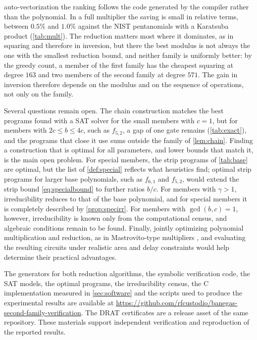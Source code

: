 \documentclass{ieeeaccess}
\theoremstyle{plain}
\theoremstyle{definition}
\begin{document}
auto-vectorization the ranking follows the code generated by the compiler
rather than the polynomial. In a full multiplier the saving is small in relative terms,
between $0.5\%$ and $1.0\%$ against the NIST pentanomials with a Karatsuba
product (\cref{tab:mult}). The reduction matters most where it dominates, as in
squaring and therefore in inversion, but there the best modulus is not always
the one with the smallest reduction bound, and neither family is uniformly
better: by the greedy count, a member of the first family has the cheapest
squaring at degree $163$ and two members of the second family at degree $571$.
The gain in inversion therefore depends on the modulus and on the sequence of
operations, not only on the family.

Several questions remain open. The chain construction matches the best programs
found with a SAT solver for the small members with $c=1$, but for members
with $2c\le b\le4c$, such as $f_{5,2}$, a gap of one gate remains
(\cref{tab:exact}), and the programs that close it use sums outside the family
of \cref{lem:chain}. Finding a construction that is optimal for all parameters,
and lower bounds that match it, is the main open problem. For special members,
the strip programs of \cref{tab:base} are optimal, but the list of
\cref{def:special} reflects what heuristics find; optimal strip programs for
larger base polynomials, such as $f_{6,1}$ and $f_{5,2}$, would extend the
strip bound \eqref{eq:specialbound} to further ratios $b/c$. For members with
$\gamma>1$, irreducibility reduces to that of the base polynomial, and for
special members it is completely described by \cref{prop:specirr}. For members
with $\gcd(b,c)=1$, however, irreducibility is known only from the
computational census, and algebraic conditions remain to be found. Finally,
jointly optimizing polynomial multiplication and reduction, as in
Mastrovito-type multipliers \cite{Mastrovito1989,ReyhaniHasan2004}, and
evaluating the resulting circuits under realistic area and delay constraints
would help determine their practical advantages.

The generators for both reduction algorithms, the symbolic verification code,
the SAT models, the optimal programs, the irreducibility census, the C
implementation measured in \cref{sec:software} and the scripts used to produce
the experimental results are available at
\url{https://github.com/rfcustodio/banegas-second-family-verification}. The DRAT
certificates are a release asset of the same repository. These materials support
independent verification and reproduction of the reported results.
\end{document}
